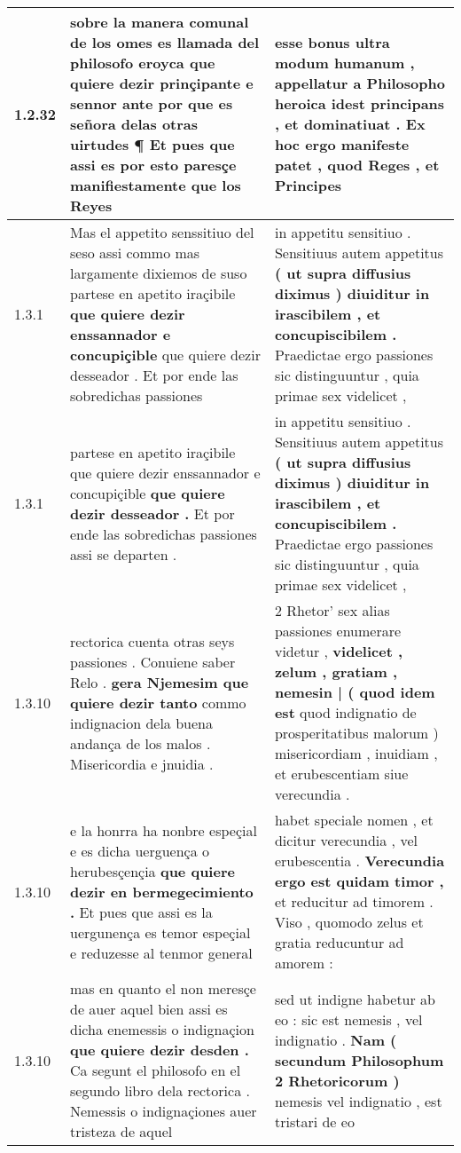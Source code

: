 \begin{tabular}{|p{1cm}|p{6.5cm}|p{6.5cm}|}
1.2.32 & sobre la manera comunal de los omes es llamada del philosofo eroyca \textbf{ que quiere dezir prinçipante e sennor ante } por que es señora delas otras uirtudes ¶ Et pues que assi es por esto paresçe manifiestamente que los Reyes & esse bonus ultra modum humanum , appellatur a Philosopho heroica \textbf{ idest principans , et dominatiuat . } Ex hoc ergo manifeste patet , quod Reges , et Principes \\\hline
1.3.1 & Mas el appetito senssitiuo del seso assi commo mas largamente dixiemos de suso partese en apetito iraçibile \textbf{ que quiere dezir enssannador e concupiçible } que quiere dezir desseador . Et por ende las sobredichas passiones & in appetitu sensitiuo . Sensitiuus autem appetitus \textbf{ ( ut supra diffusius diximus ) diuiditur in irascibilem , et concupiscibilem . } Praedictae ergo passiones sic distinguuntur , quia primae sex videlicet , \\\hline
1.3.1 & partese en apetito iraçibile que quiere dezir enssannador e concupiçible \textbf{ que quiere dezir desseador . } Et por ende las sobredichas passiones assi se departen . & in appetitu sensitiuo . Sensitiuus autem appetitus \textbf{ ( ut supra diffusius diximus ) diuiditur in irascibilem , et concupiscibilem . } Praedictae ergo passiones sic distinguuntur , quia primae sex videlicet , \\\hline
1.3.10 & rectorica cuenta otras seys passiones . Conuiene saber Relo . \textbf{ gera Njemesim que quiere dezir tanto } commo indignacion dela buena andança de los malos . Misericordia e jnuidia . & 2 Rhetor’ sex alias passiones enumerare videtur , \textbf{ videlicet , zelum , gratiam , nemesin | ( quod idem est } quod indignatio de prosperitatibus malorum ) misericordiam , inuidiam , et erubescentiam siue verecundia . \\\hline
1.3.10 & e la honrra ha nonbre espeçial e es dicha uerguença o herubesçençia \textbf{ que quiere dezir en bermegecimiento . } Et pues que assi es la uergunença es temor espeçial e reduzesse al tenmor general & habet speciale nomen , et dicitur verecundia , vel erubescentia . \textbf{ Verecundia ergo est quidam timor , } et reducitur ad timorem . Viso , quomodo zelus et gratia reducuntur ad amorem : \\\hline
1.3.10 & mas en quanto el non meresçe de auer aquel bien assi es dicha enemessis o indignaçion \textbf{ que quiere dezir desden . } Ca segunt el philosofo en el segundo libro dela rectorica . Nemessis o indignaçiones auer tristeza de aquel & sed ut indigne habetur ab eo : sic est nemesis , vel indignatio . \textbf{ Nam ( secundum Philosophum 2 Rhetoricorum ) } nemesis vel indignatio , est tristari de eo \\\hline

\end{tabular}
